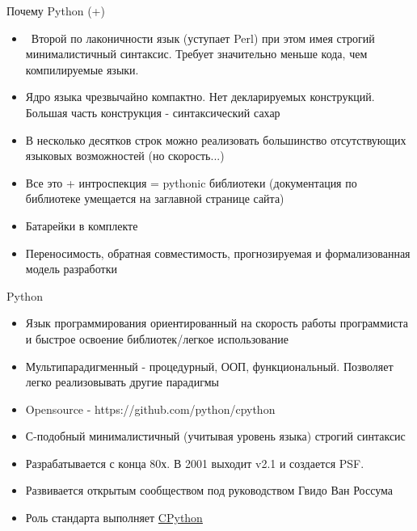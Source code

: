 \documentclass{article}
\begin{document}
\begin{center} Почему Python (+) \end{center}
\begin{itemize}
    \item ~Второй по лаконичности язык (уступает Perl) при этом имея строгий 
            минималистичный синтаксис. Требует значительно меньше кода, чем компилируемые языки.
    \item Ядро языка чрезвычайно компактно. Нет декларируемых конструкций. 
            Большая часть конструкция - синтаксический сахар
    \item В несколько десятков строк можно реализовать большинство отсутствующих языковых возможностей
           (но скорость...)
    \item Все это + интроспекция = pythonic библиотеки 
        (документация по библиотеке умещается на заглавной странице сайта)
    \item Батарейки в комплекте
    \item Переносимость, обратная совместимость, прогнозируемая и формализованная модель разработки
\end{itemize}
\newpage

\begin{center} Python \end{center}
\begin{itemize}
    \item Язык программирования ориентированный на скорость работы программиста и
        быстрое освоение библиотек/легкое использование
    \item Мультипарадигменный - процедурный, ООП, функциональный. Позволяет легко реализовывать другие парадигмы
    \item Opensource - https://github.com/python/cpython
    \item С-подобный минималистичный (учитывая уровень языка) строгий синтаксис
    \item Разрабатывается с конца 80х. В 2001 выходит v2.1 и создается PSF.
    \item Развивается открытым сообществом под руководством Гвидо Ван Россума
    \item Роль стандарта выполняет \href{http://www.python.org}{CPython}
\end{itemize}
\newpage
\end{document}
